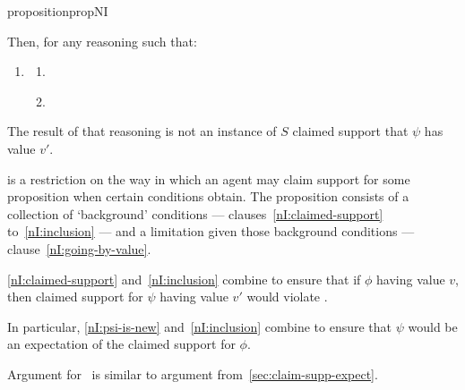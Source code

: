 \begin{note}[\nI{}]
\begin{restatable}[\nI{-}  --- \nI{}]{proposition}{propNI}
\begin{enumerate}[ref=\named{\nIacro{}:\arabic*}, resume*=nI_counter]
\begin{enumerate}[label=\alph*., ref=\named{\nIacro{}2:\alph*}]
      \end{enumerate}
    \end{enumerate}
    Then, for any reasoning such that:
    \begin{enumerate}[ref=\named{\nIacro{}:\arabic*}, resume*=nI_counter]
    \item\label{nI:going-by-value} \nIClauseValue{}
      \begin{enumerate}[label=\alph*., ref=\named{\nIacro{}3:\alph*}]
      \item\label{nI:going-by-value:phi} \nIClauseValuePhi{}
      \item\label{nI:goingbyvalue:psi} \nIClauseValuePsi{}
      \end{enumerate}
    \end{enumerate}
    The result of that reasoning is not an instance of \(S\) claimed support that \(\psi\) has value \(v'\).
    \vspace{-\baselineskip}
  \end{restatable}
\end{note}

\begin{note}
  \nI{} is a restriction on the way in which an agent may claim support for some proposition when certain conditions obtain.
  The proposition consists of a collection of `background' conditions --- clauses~\ref{nI:claimed-support} to~\ref{nI:inclusion} --- and a limitation given those background conditions --- clause~\ref{nI:going-by-value}.

  \ref{nI:claimed-support} and~\ref{nI:inclusion} combine to ensure that if \(\phi\) having value \(v\), then claimed support for \(\psi\) having value \(v'\) would violate \eiS{}.
  {
    \color{red} In particular, \ref{nI:psi-is-new} and~\ref{nI:inclusion} combine to ensure that \(\psi\) would be an expectation of the claimed support for \(\phi\).

    Argument for~\nI{} is similar to argument from~\ref{sec:claim-supp-expect}.
  }
\end{note}

